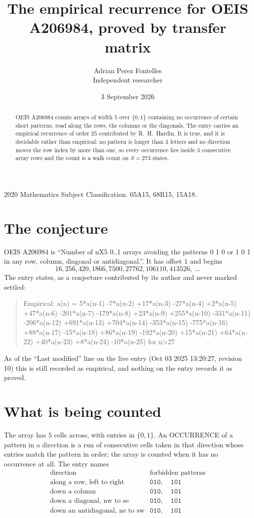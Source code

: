 \documentclass[11pt,a4paper]{article}
\title{The empirical recurrence for OEIS A206984, proved by transfer matrix}
\author{Adrian Perez Fontelles\\ \small Independent researcher}
\date{3 September 2026}
\theoremstyle{plain}
\theoremstyle{definition}
\begin{document}
\maketitle

\begin{abstract}
OEIS A206984 counts arrays of width $5$ over $\{0,1\}$ containing no occurrence of certain short
patterns, read along the rows, the columns or the diagonals. The entry carries an empirical
recurrence of order $25$ contributed by R.~H.~Hardin. It is true, and it is decidable
rather than empirical: no pattern is longer than $3$ letters and no direction moves the row
index by more than one, so every occurrence lies inside $3$ consecutive array rows and the
count is a walk count on $S=273$ states.
\end{abstract}

\noindent\small 2020 Mathematics Subject Classification. 05A15, 68R15, 15A18.\normalsize

\section{The conjecture}

OEIS A206984 is ``Number of nX5 0..1 arrays avoiding the patterns 0 1 0 or 1 0 1 in any row, column, diagonal or antidiagonal.''. It has offset $1$ and begins
\[
16, 256, 420, 1866, 7500, 27762, 106110, 413526,\ \dots
\]
The entry states, as a conjecture contributed by its author and never marked settled:
\begin{quote}
Empirical: a(n) = 5*a(n-1) -7*a(n-2) +17*a(n-3) -27*a(n-4) +2*a(n-5) +47*a(n-6) -201*a(n-7) -179*a(n-8) +23*a(n-9) +255*a(n-10) -331*a(n-11) -206*a(n-12) +691*a(n-13) +704*a(n-14) -353*a(n-15) -775*a(n-16) +88*a(n-17) -15*a(n-18) +86*a(n-19) -192*a(n-20) +15*a(n-21) +64*a(n-22) +40*a(n-23) +8*a(n-24) -10*a(n-25) for n>27
\end{quote}
As of the ``Last modified'' line on the live entry (Oct 03 2025 13:20:27, revision 10) this is still
recorded as empirical, and nothing on the entry records it as proved.

\section{What is being counted}

The array has $5$ cells across, with entries in $\{0,1\}$. An OCCURRENCE of a pattern in a
direction is a run of consecutive cells taken in that direction whose entries match the pattern
in order; the array is counted when it has no occurrence at all. The entry names
\[
\begin{array}{ll}
\text{direction} & \text{forbidden patterns} \\[2pt]
\text{along a row, left to right} & \mathtt{010},\quad \mathtt{101} \\
\text{down a column} & \mathtt{010},\quad \mathtt{101} \\
\text{down a diagonal, nw to se} & \mathtt{010},\quad \mathtt{101} \\
\text{down an antidiagonal, ne to sw} & \mathtt{010},\quad \mathtt{101} \\
\end{array}
\]
\end{document}
